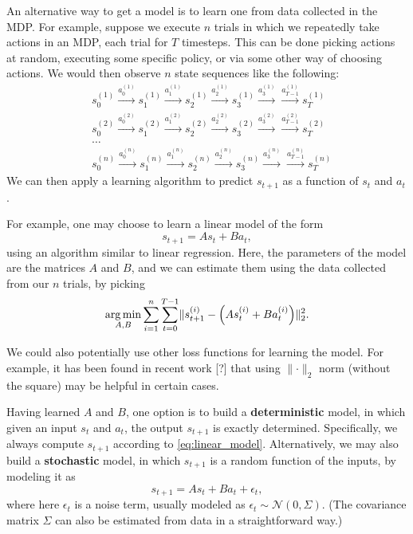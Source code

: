 An alternative way to get a model is to learn one from data collected in
the MDP. For example, suppose we execute $n$ trials in which we repeatedly
take actions in an MDP, each trial for $T$ timesteps. This can be done picking
actions at random, executing some specific policy, or via some other way of
choosing actions. We would then observe $n$ state sequences like the following:
\begin{align*}
    &s_0^{(1)} \overset{a_0^{(1)}}{\longrightarrow} s_1^{(1)} \overset{a_1^{(1)}}{\longrightarrow} s_2^{(1)} \overset{a_2^{(1)}}{\longrightarrow} s_3^{(1)} \overset{a_3^{(1)}}{\longrightarrow} \overset{a_{T-1}^{(1)}}{\longrightarrow} s_T^{(1)} \\
    &s_0^{(2)} \overset{a_0^{(2)}}{\longrightarrow} s_1^{(2)} \overset{a_1^{(2)}}{\longrightarrow} s_2^{(2)} \overset{a_2^{(2)}}{\longrightarrow} s_3^{(2)} \overset{a_3^{(2)}}{\longrightarrow} \overset{a_{T-1}^{(2)}}{\longrightarrow} s_T^{(2)} \\
    &\ldots\\
    &s_0^{(n)} \overset{a_0^{(n)}}{\longrightarrow} s_1^{(n)} \overset{a_1^{(n)}}{\longrightarrow} s_2^{(n)} \overset{a_2^{(n)}}{\longrightarrow} s_3^{(n)} \overset{a_3^{(n)}}{\longrightarrow} \overset{a_{T-1}^{(n)}}{\longrightarrow} s_T^{(n)}
\end{align*}
We can then apply a learning algorithm to predict $s_{t+1}$ as a function of $s_t$ and $a_t$.

For example, one may choose to learn a linear model of the form
\begin{equation}\label{eq:linear_model}
    s_{t+1} = As_t + Ba_t,
\end{equation}
using an algorithm similar to linear regression. Here, the parameters of the
model are the matrices $A$ and $B$, and we can estimate them using the data
collected from our $n$ trials, by picking
\[
    \argmin_{A,B} \sum_{i=1}^n \sum_{t=0}^{T-1} \lVert s_{t+1}^{(i)} - \left(As_t^{(i)} + Ba_t^{(i)} \right) \rVert_2^2.
\]

We could also potentially use other loss functions for learning the model.
For example, it has been found in recent work [?] that using $\lVert \cdot \rVert_2$ norm %
(without the square) may be helpful in certain cases.

Having learned $A$ and $B$, one option is to build a \textbf{deterministic} model,
in which given an input $s_t$ and $a_t$, the output $s_{t+1}$ is exactly determined.
Specifically, we always compute $s_{t+1}$ according to \cref{eq:linear_model}.
Alternatively, we may also build a \textbf{stochastic} model, in which $s_{t+1}$ is a random
function of the inputs, by modeling it as
\[
    s_{t+1} = As_t + Ba_t + \epsilon_t,
\]
where here $\epsilon_t$ is a noise term, usually modeled as $\epsilon_t \sim \mathcal N(0,\Sigma)$. (The
covariance matrix $\Sigma$ can also be estimated from data in a straightforward way.)

